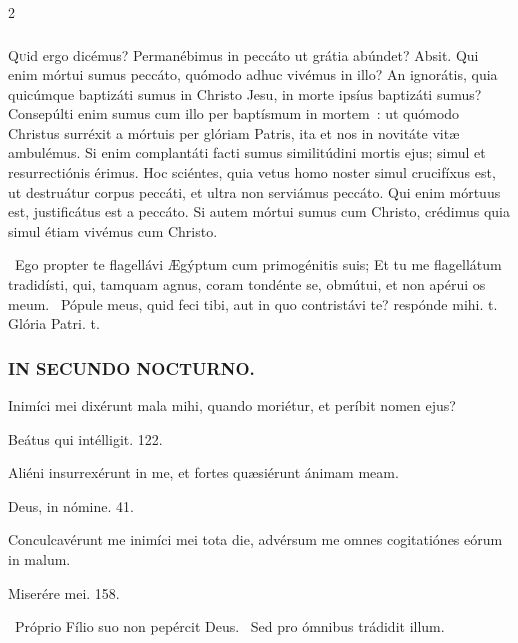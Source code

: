 \documentclass[9pt,twoside]{extarticle}
\begin{document}
\begin{multicols}{2}
{\subsubsection*{\center{}}
\lettrine{Q}uid ergo dicémus? Permanébimus in peccáto ut grátia abúndet? Absit. Qui enim mórtui sumus peccáto, quómodo adhuc vivémus in illo? An ignorátis, quia quicúmque baptizáti sumus in Christo Jesu, in morte ipsíus baptizáti sumus? Consepúlti enim sumus cum illo per baptísmum in mortem~: ut quómodo Christus surréxit a mórtuis per glóriam Patris, ita et nos in novitáte vitæ ambulémus. Si enim complantáti facti sumus similitúdini mortis ejus; simul et resurrectiónis érimus. Hoc sciéntes, quia vetus homo noster simul crucifíxus est, ut destruátur corpus peccáti, et ultra non serviámus peccáto. Qui enim mórtuus est, justificátus est a peccáto. Si autem mórtui sumus cum Christo, crédimus quia simul étiam vivémus cum Christo.

\begin{tightlist}{}
\item {}~Ego propter te flagellávi Ægýptum cum primogénitis suis; \textred{*} Et tu me flagellátum tradidísti, qui, tamquam agnus, coram tondénte se, obmútui, et non apérui os meum. ~Pópule meus, quid feci tibi, aut in quo contristávi te? respónde mihi. t.  Glória Patri. t.
\end{tightlist}

\subsubsection*{\center \textsc{IN SECUNDO NOCTURNO.}}
\begin{tightlist}{}
\item {} Inimíci mei dixérunt mala mihi, quando moriétur, et períbit nomen ejus?
\item {} Beátus qui intélligit. 122.
\item {} Aliéni insurrexérunt in me, et fortes quæsiérunt ánimam meam.
\item {} Deus, in nómine. 41.
\item {} Conculcavérunt me inimíci mei tota die, advérsum me omnes cogitatiónes eórum in malum.
\item {} Miserére mei. 158.
\item {}~Próprio Fílio suo non pepércit Deus. ~Sed pro ómnibus trádidit illum.
\end{tightlist}

}
\end{multicols}
\end{document}
